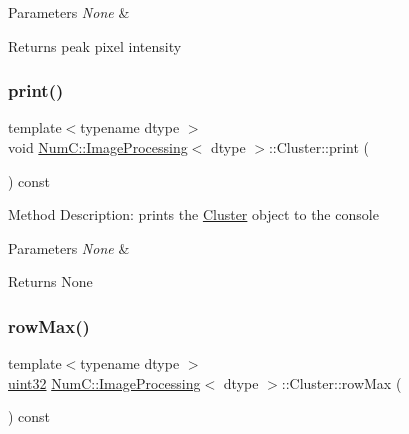 \begin{DoxyParams}{Parameters}
{\em None} & \\
\hline
\end{DoxyParams}
\begin{DoxyReturn}{Returns}
peak pixel intensity 
\end{DoxyReturn}
\mbox{\label{class_num_c_1_1_image_processing_1_1_cluster_a0315ecfcc3c448adc605d86c21e529e3}} 
\subsubsection{\texorpdfstring{print()}{print()}}
{\footnotesize\ttfamily template$<$typename dtype $>$ \\
void \mbox{\hyperlink{class_num_c_1_1_image_processing}{Num\+C\+::\+Image\+Processing}}$<$ dtype $>$\+::Cluster\+::print (\begin{DoxyParamCaption}{ }\end{DoxyParamCaption}) const\hspace{0.3cm}{\ttfamily [inline]}}

Method Description\+: prints the \mbox{\hyperlink{class_num_c_1_1_image_processing_1_1_cluster}{Cluster}} object to the console


\begin{DoxyParams}{Parameters}
{\em None} & \\
\hline
\end{DoxyParams}
\begin{DoxyReturn}{Returns}
None 
\end{DoxyReturn}
\mbox{\label{class_num_c_1_1_image_processing_1_1_cluster_a90036e75f85a60f0d8a55d7cf8975da5}} 
\subsubsection{\texorpdfstring{row\+Max()}{rowMax()}}
{\footnotesize\ttfamily template$<$typename dtype $>$ \\
\mbox{\hyperlink{namespace_num_c_ae685802ca6d3035f2b400b081e3953fa}{uint32}} \mbox{\hyperlink{class_num_c_1_1_image_processing}{Num\+C\+::\+Image\+Processing}}$<$ dtype $>$\+::Cluster\+::row\+Max (\begin{DoxyParamCaption}{ }\end{DoxyParamCaption}) const\hspace{0.3cm}{\ttfamily [inline]}}

